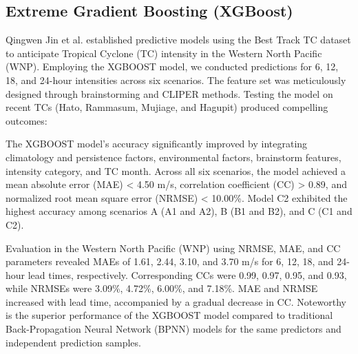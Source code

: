 \documentclass{ieeeojies}
\begin{document}
\subsection{\textbf{Extreme Gradient Boosting (XGBoost)}}
\hspace{0.3cm}Qingwen Jin et al.\cite{article3} established predictive models using the Best Track TC dataset to anticipate Tropical Cyclone (TC) intensity in the Western North Pacific (WNP). Employing the XGBOOST model, we conducted predictions for 6, 12, 18, and 24-hour intensities across six scenarios. The feature set was meticulously designed through brainstorming and CLIPER methods. Testing the model on recent TCs (Hato, Rammasum, Mujiage, and Hagupit) produced compelling outcomes:

The XGBOOST model's accuracy significantly improved by integrating climatology and persistence factors, environmental factors, brainstorm features, intensity category, and TC month. Across all six scenarios, the model achieved a mean absolute error (MAE) < 4.50 m/s, correlation coefficient (CC) > 0.89, and normalized root mean square error (NRMSE) < 10.00\%. Model C2 exhibited the highest accuracy among scenarios A (A1 and A2), B (B1 and B2), and C (C1 and C2).

Evaluation in the Western North Pacific (WNP) using NRMSE, MAE, and CC parameters revealed MAEs of 1.61, 2.44, 3.10, and 3.70 m/s for 6, 12, 18, and 24-hour lead times, respectively. Corresponding CCs were 0.99, 0.97, 0.95, and 0.93, while NRMSEs were 3.09\%, 4.72\%, 6.00\%, and 7.18\%. MAE and NRMSE increased with lead time, accompanied by a gradual decrease in CC. Noteworthy is the superior performance of the XGBOOST model compared to traditional Back-Propagation Neural Network (BPNN) models for the same predictors and independent prediction samples.
\end{document}
